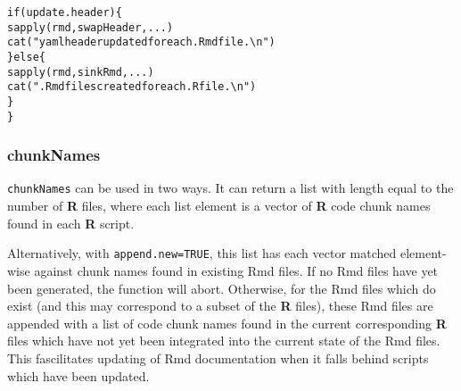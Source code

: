 \documentclass{article}\usepackage[]{graphicx}\usepackage[]{color}
\makeatletter
\newcommand{\hlstr}[1]{\textcolor[rgb]{0.863,0.196,0.184}{#1}}%
\newcommand{\hlstd}[1]{\textcolor[rgb]{0.514,0.58,0.588}{#1}}%
\newcommand{\hlkwa}[1]{\textcolor[rgb]{0.796,0.294,0.086}{#1}}%
\newcommand{\hlkwd}[1]{\textcolor[rgb]{0.576,0.631,0.631}{#1}}%
\newenvironment{kframe}{%
 \def\at@end@of@kframe{}%
 \ifinner\ifhmode%
  \def\at@end@of@kframe{\end{minipage}}%
  \begin{minipage}{\columnwidth}%
 \fi\fi%
 \def\FrameCommand##1{\hskip\@totalleftmargin \hskip-\fboxsep
 \colorbox{shadecolor}{##1}\hskip-\fboxsep
     \hskip-\linewidth \hskip-\@totalleftmargin \hskip\columnwidth}%
 \MakeFramed {\advance\hsize-\width
   \@totalleftmargin\z@ \linewidth\hsize
   \@setminipage}}%
 {\par\unskip\endMakeFramed%
 \at@end@of@kframe}
\newenvironment{knitrout}{}{} %
\makeatother
\begin{document}
\begin{knitrout}
\begin{kframe}
\begin{alltt}
    \hlkwa{if} \hlstd{(update.header) \{}
        \hlkwd{sapply}\hlstd{(rmd, swapHeader, ...)}
        \hlkwd{cat}\hlstd{(}\hlstr{"yaml header updated for each .Rmd file.\textbackslash{}n"}\hlstd{)}
    \hlstd{\}} \hlkwa{else} \hlstd{\{}
        \hlkwd{sapply}\hlstd{(rmd, sinkRmd, ...)}
        \hlkwd{cat}\hlstd{(}\hlstr{".Rmd files created for each .R file.\textbackslash{}n"}\hlstd{)}
    \hlstd{\}}
\hlstd{\}}
\end{alltt}
\end{kframe}
\end{knitrout}

\subsubsection{chunkNames}
\texttt{chunkNames} can be used in two ways.
It can return a list with length equal to the number of \textbf{R} files,
where each list element is a vector of \textbf{R} code chunk names found in each \textbf{R} script.

Alternatively, with \texttt{append.new=TRUE}, this list has each vector matched element-wise against chunk names found in existing Rmd files.
If no Rmd files have yet been generated, the function will abort.
Otherwise, for the Rmd files which do exist (and this may correspond to a subset of the \textbf{R} files),
these Rmd files are appended with a list of code chunk names found in the current corresponding \textbf{R} files
which have not yet been integrated into the current state of the Rmd files.
This fascilitates updating of Rmd documentation when it falls behind scripts which have been updated.
\end{document}
